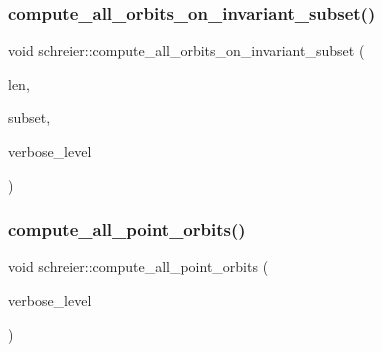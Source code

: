 \subsubsection{\texorpdfstring{compute\+\_\+all\+\_\+orbits\+\_\+on\+\_\+invariant\+\_\+subset()}{compute\_all\_orbits\_on\_invariant\_subset()}}
{\footnotesize\ttfamily void schreier\+::compute\+\_\+all\+\_\+orbits\+\_\+on\+\_\+invariant\+\_\+subset (\begin{DoxyParamCaption}\item[{\mbox{\hyperlink{galois_8h_a09fddde158a3a20bd2dcadb609de11dc}{I\+NT}}}]{len,  }\item[{\mbox{\hyperlink{galois_8h_a09fddde158a3a20bd2dcadb609de11dc}{I\+NT}} $\ast$}]{subset,  }\item[{\mbox{\hyperlink{galois_8h_a09fddde158a3a20bd2dcadb609de11dc}{I\+NT}}}]{verbose\+\_\+level }\end{DoxyParamCaption})}

\mbox{\label{classschreier_a1deec048f51f380bc3476d4cd4d95e94}} 
\subsubsection{\texorpdfstring{compute\+\_\+all\+\_\+point\+\_\+orbits()}{compute\_all\_point\_orbits()}}
{\footnotesize\ttfamily void schreier\+::compute\+\_\+all\+\_\+point\+\_\+orbits (\begin{DoxyParamCaption}\item[{\mbox{\hyperlink{galois_8h_a09fddde158a3a20bd2dcadb609de11dc}{I\+NT}}}]{verbose\+\_\+level }\end{DoxyParamCaption})}

\mbox{\label{classschreier_a3669602ae33fc6fcd516b13ac32cf152}} 
